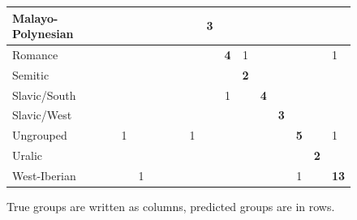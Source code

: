 \documentclass[a4paper,10pt]{article}
\begin{document}
\begin{landscape}
\begin{figure}[H]
\begin{tabularx}{\textwidth}{XrccccXcXccXXccX}
\midrule
    Malayo-Polynesian &                    &          &        &          &         &                 &               &    \textbf{3}      &          &          &               &              &            &         &               \\
\midrule
    Romance           &                    &          &        &          &         &                 &               &                    & \textbf{4} &        1 &               &              &            &         &             1 \\
\midrule
    Semitic           &                    &          &        &          &         &                 &               &                    &          & \textbf{2} &               &              &            &         &               \\
\midrule
    Slavic/South      &                    &          &        &          &         &                 &               &                    &        1 &          & \textbf{4}    &              &            &         &               \\
\midrule
    Slavic/West       &                    &          &        &          &         &                 &               &                    &          &          &               & \textbf{3}   &            &         &               \\
\midrule
    Ungrouped         &                    &        1 &        &          &         &                 &             1 &                    &          &          &               &              & \textbf{5} &         &             1 \\
\midrule
    Uralic            &                    &          &        &          &         &                 &               &                    &          &          &               &              &            & \textbf{2} &               \\
\midrule
    West-Iberian      &                    &          &      1 &          &         &                 &               &                    &          &          &               &              &          1 &         &  \textbf{13}  \\
\bottomrule
\end{tabularx}
\caption{True groups are written as columns, predicted groups are in rows.}
\label{confmat2}
\end{figure}
\end{landscape}
\end{document}
